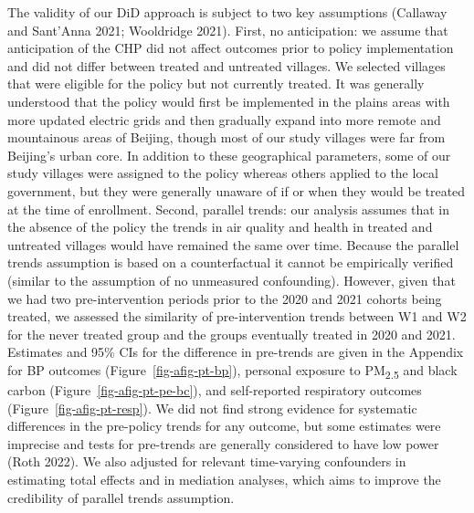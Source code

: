 \documentclass[
  letterpaper,
  DIV=11,
  numbers=noendperiod]{scrartcl}
\begin{document}
The validity of our DiD approach is subject to two key assumptions
(Callaway and Sant'Anna 2021; Wooldridge 2021). First, no anticipation:
we assume that anticipation of the CHP did not affect outcomes prior to
policy implementation and did not differ between treated and untreated
villages. We selected villages that were eligible for the policy but not
currently treated. It was generally understood that the policy would
first be implemented in the plains areas with more updated electric
grids and then gradually expand into more remote and mountainous areas
of Beijing, though most of our study villages were far from Beijing's
urban core. In addition to these geographical parameters, some of our
study villages were assigned to the policy whereas others applied to the
local government, but they were generally unaware of if or when they
would be treated at the time of enrollment. Second, parallel trends: our
analysis assumes that in the absence of the policy the trends in air
quality and health in treated and untreated villages would have remained
the same over time. Because the parallel trends assumption is based on a
counterfactual it cannot be empirically verified (similar to the
assumption of no unmeasured confounding). However,  given
that we had two pre-intervention periods prior to the 2020 and 2021
cohorts being treated, we assessed the similarity of pre-intervention
trends between W1 and W2 for the never treated group and the groups
eventually treated in 2020 and 2021. Estimates and 95\% CIs for the
difference in pre-trends are given in the Appendix for BP outcomes
(Figure~\ref{fig-afig-pt-bp}), personal exposure to
PM\textsubscript{2.5} and black carbon (Figure~\ref{fig-afig-pt-pe-bc}),
and self-reported respiratory outcomes (Figure~\ref{fig-afig-pt-resp}).
We did not find strong evidence for systematic differences in the
pre-policy trends for any outcome, but some estimates were imprecise and
tests for pre-trends are generally considered to have low power (Roth
2022). We also adjusted for relevant time-varying confounders in
estimating total effects and in mediation analyses, which aims to
improve the credibility of parallel trends assumption.
\end{document}
